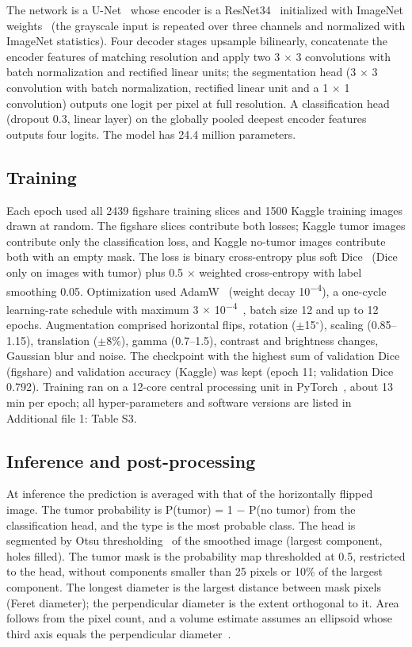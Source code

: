 \documentclass[pdflatex,sn-vancouver-num]{sn-jnl}
\begin{document}
The network is a U-Net~\cite{ronneberger2015} whose encoder is a ResNet34~\cite{he2016resnet} initialized with ImageNet weights~\cite{deng2009imagenet} (the grayscale input is repeated over three channels and normalized with ImageNet statistics). Four decoder stages upsample bilinearly, concatenate the encoder features of matching resolution and apply two 3 $\times$ 3 convolutions with batch normalization and rectified linear units; the segmentation head (3 $\times$ 3 convolution with batch normalization, rectified linear unit and a 1 $\times$ 1 convolution) outputs one logit per pixel at full resolution. A classification head (dropout 0.3, linear layer) on the globally pooled deepest encoder features outputs four logits. The model has 24.4 million parameters.

\subsection{Training}

Each epoch used all 2439 figshare training slices and 1500 Kaggle training images drawn at random. The figshare slices contribute both losses; Kaggle tumor images contribute only the classification loss, and Kaggle no-tumor images contribute both with an empty mask. The loss is binary cross-entropy plus soft Dice~\cite{milletari2016vnet} (Dice only on images with tumor) plus 0.5 $\times$ weighted cross-entropy with label smoothing 0.05. Optimization used AdamW~\cite{loshchilov2019adamw} (weight decay 10\textsuperscript{$-$4}), a one-cycle learning-rate schedule with maximum 3 $\times$ 10\textsuperscript{$-$4}~\cite{smith2019onecycle}, batch size 12 and up to 12 epochs. Augmentation comprised horizontal flips, rotation ($\pm$15$^\circ$), scaling (0.85--1.15), translation ($\pm$8\%), gamma (0.7--1.5), contrast and brightness changes, Gaussian blur and noise. The checkpoint with the highest sum of validation Dice (figshare) and validation accuracy (Kaggle) was kept (epoch 11; validation Dice 0.792). Training ran on a 12-core central processing unit in PyTorch~\cite{paszke2019pytorch}, about 13 min per epoch; all hyper-parameters and software versions are listed in Additional file 1: Table S3.

\subsection{Inference and post-processing}

At inference the prediction is averaged with that of the horizontally flipped image. The tumor probability is P(tumor) = 1 $-$ P(no tumor) from the classification head, and the type is the most probable class. The head is segmented by Otsu thresholding~\cite{otsu1979} of the smoothed image (largest component, holes filled). The tumor mask is the probability map thresholded at 0.5, restricted to the head, without components smaller than 25 pixels or 10\% of the largest component. The longest diameter is the largest distance between mask pixels (Feret diameter); the perpendicular diameter is the extent orthogonal to it. Area follows from the pixel count, and a volume estimate assumes an ellipsoid whose third axis equals the perpendicular diameter~\cite{kothari1996}.
\end{document}
